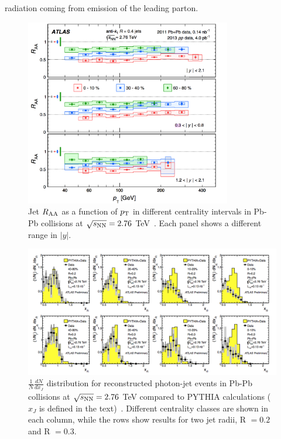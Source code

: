 radiation coming from emission of the leading parton.\\
\begin{figure}[!ht]
  \centering
  \includegraphics[width=9cm]{FigCap1/ATLASjetsRaa.png}
  \caption{Jet $R_{\rm AA}$ as a function of $p_{\rm T}$ in different centrality
intervals in Pb-Pb collisions at $\sqrt{s_{\rm NN}} = 2.76$ TeV~\cite{Aad:2014bxa}. Each panel shows a different range in $|y|$.}
  \label{fig:ATLASjetsRaa}
\end{figure}
\begin{figure}[!ht]
  \centering
  \includegraphics[width=15cm]{FigCap1/ATLASdiijetGammaZ.png}
  \caption{$\frac{1}{N}\frac{dN}{dx_J}$ distribution for reconstructed photon-jet events in Pb-Pb collisions at $\sqrt{s_{\rm NN}} = 2.76$ TeV compared to PYTHIA calculations ($x_J$ is defined in the text)~\cite{ATLAS-CONF-2012-121}. Different centrality classes are shown in each column, while the rows show results for two jet radii, R $= 0.2$ and R $=0.3$.}
  \label{fig:ATLASdijetAsymm}
\end{figure} 



